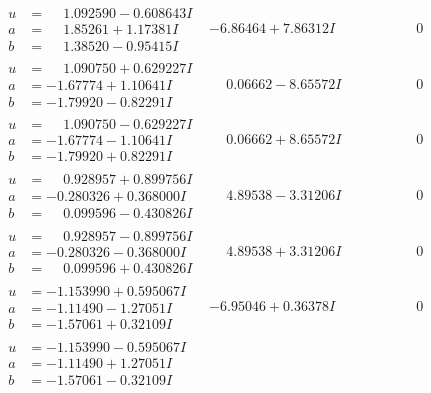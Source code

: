 \documentclass[1p]{elsarticle_modified}
\theoremstyle{definition}
\begin{document}
$$\begin{array}{c|c|c}
 \hline 
\begin{aligned}
u &= \phantom{-}1.092590 - 0.608643 I \\
a &= \phantom{-}1.85261 + 1.17381 I \\
b &= \phantom{-}1.38520 - 0.95415 I\end{aligned}
 & -6.86464 + 7.86312 I & \phantom{-0.000000 } 0 \\ \hline\begin{aligned}
u &= \phantom{-}1.090750 + 0.629227 I \\
a &= -1.67774 + 1.10641 I \\
b &= -1.79920 - 0.82291 I\end{aligned}
 & \phantom{-}0.06662 - 8.65572 I & \phantom{-0.000000 } 0 \\ \hline\begin{aligned}
u &= \phantom{-}1.090750 - 0.629227 I \\
a &= -1.67774 - 1.10641 I \\
b &= -1.79920 + 0.82291 I\end{aligned}
 & \phantom{-}0.06662 + 8.65572 I & \phantom{-0.000000 } 0 \\ \hline\begin{aligned}
u &= \phantom{-}0.928957 + 0.899756 I \\
a &= -0.280326 + 0.368000 I \\
b &= \phantom{-}0.099596 - 0.430826 I\end{aligned}
 & \phantom{-}4.89538 - 3.31206 I & \phantom{-0.000000 } 0 \\ \hline\begin{aligned}
u &= \phantom{-}0.928957 - 0.899756 I \\
a &= -0.280326 - 0.368000 I \\
b &= \phantom{-}0.099596 + 0.430826 I\end{aligned}
 & \phantom{-}4.89538 + 3.31206 I & \phantom{-0.000000 } 0 \\ \hline\begin{aligned}
u &= -1.153990 + 0.595067 I \\
a &= -1.11490 - 1.27051 I \\
b &= -1.57061 + 0.32109 I\end{aligned}
 & -6.95046 + 0.36378 I & \phantom{-0.000000 } 0 \\ \hline\begin{aligned}
u &= -1.153990 - 0.595067 I \\
a &= -1.11490 + 1.27051 I \\
b &= -1.57061 - 0.32109 I\end{aligned}

\end{array}$$
\end{document}
